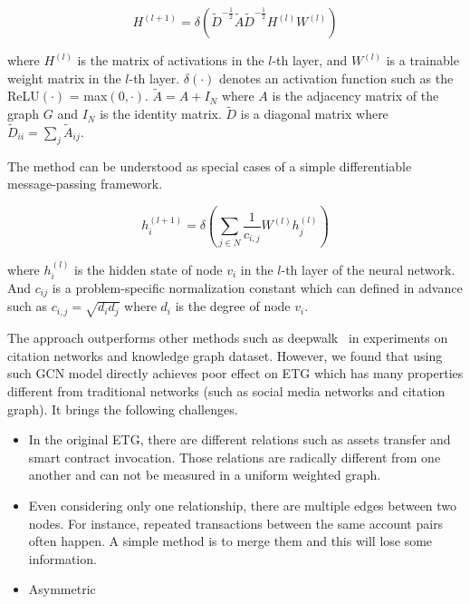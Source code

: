 \begin{equation}
H^{(l+1)}=\delta(\tilde{D}^{-\frac{1}{2}}\tilde{A}\tilde{D}^{-\frac{1}{2}}H^{(l)}W^{(l)})
\label{eq1}
\end{equation}

where $H^{(l)}$ is the matrix of activations in the $l$-th layer, and $W^{(l)}$ is a trainable weight matrix in the $l$-th layer. $\delta(\cdot)$ denotes an activation function such as the ReLU$(\cdot)$ = max$(0,\cdot)$. $\tilde{A}=A+I_N$ where $A$ is the adjacency matrix of the graph $G$ and $I_N$ is the identity matrix. $\tilde{D}$ is a diagonal matrix where $\tilde{D}_{ii}=\sum_{j}\tilde{A}_{ij}$.

 The method can be understood as special cases of a simple differentiable message-passing framework.

\begin{equation}
h_i^{(l+1)}=\delta(\sum_{j \in N} \frac{1}{c_{i,j}}W^{(l)}h_j^{(l)})
\label{eq:gcn}
\end{equation}

where $h_i^{(l)}$ is the hidden state of node $v_i$ in the $l$-th layer of the neural network. And $c_{ij}$ is a problem-specific normalization constant which can defined in advance such as $c_{i,j}=\sqrt{d_i d_j}$ where $d_i$ is the degree of node $v_i$.

The approach outperforms other methods such as deepwalk~\cite{perozzi2014deepwalk} in experiments on citation networks and knowledge graph dataset. However, we found that using such GCN model directly achieves poor effect on ETG which has many properties different from traditional networks (such as social media networks and citation graph). It brings the following challenges.

\begin{itemize}
\item In the original ETG, there are different relations such as assets transfer and smart contract invocation. Those relations are radically different from one another and can not be measured in a uniform weighted graph.
\item Even considering only one relationship, there are multiple edges between two nodes. For instance, repeated transactions between the same account pairs often happen. A simple method is to merge them and this will lose some information.
\item Asymmetric
\end{itemize}

